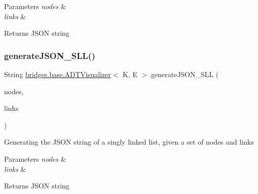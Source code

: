 \begin{DoxyParams}{Parameters}
{\em nodes} & \\
\hline
{\em links} & \\
\hline
\end{DoxyParams}
\begin{DoxyReturn}{Returns}
J\+S\+ON string 
\end{DoxyReturn}
\hypertarget{classbridges_1_1base_1_1_a_d_t_visualizer_adf2164b7f4b3befb8b2cb2904efd8c91}{}\label{classbridges_1_1base_1_1_a_d_t_visualizer_adf2164b7f4b3befb8b2cb2904efd8c91} 
\subsubsection{\texorpdfstring{generate\+J\+S\+O\+N\+\_\+\+S\+L\+L()}{generateJSON\_SLL()}}
{\footnotesize\ttfamily String \hyperlink{classbridges_1_1base_1_1_a_d_t_visualizer}{bridges.\+base.\+A\+D\+T\+Visualizer}$<$ K, E $>$.generate\+J\+S\+O\+N\+\_\+\+S\+LL (\begin{DoxyParamCaption}\item[{Linked\+List$<$ \hyperlink{classbridges_1_1base_1_1_s_lelement}{S\+Lelement}$<$ E $>$$>$}]{nodes,  }\item[{Linked\+List$<$ \hyperlink{classbridges_1_1base_1_1_s_lelement}{S\+Lelement}$<$ E $>$$>$}]{links }\end{DoxyParamCaption})}

Generating the J\+S\+ON string of a singly linked list, given a set of nodes and links


\begin{DoxyParams}{Parameters}
{\em nodes} & \\
\hline
{\em links} & \\
\hline
\end{DoxyParams}
\begin{DoxyReturn}{Returns}
J\+S\+ON string 
\end{DoxyReturn}
\hypertarget{classbridges_1_1base_1_1_a_d_t_visualizer_ab3e96c568b11f9ef683191d1e03d5719}{}\label{classbridges_1_1base_1_1_a_d_t_visualizer_ab3e96c568b11f9ef683191d1e03d5719} 
